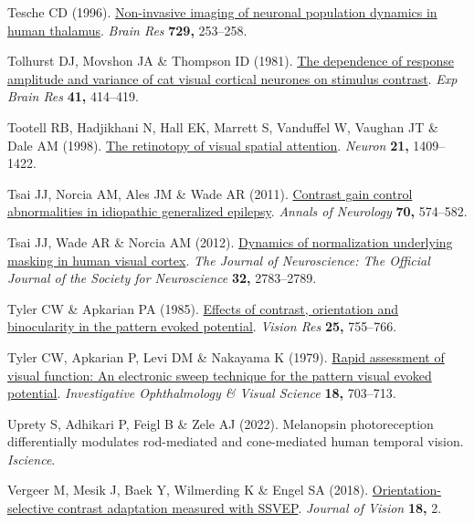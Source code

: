 \documentclass[
  letterpaper,
  DIV=11,
  numbers=noendperiod]{scrartcl}
\newlength{\cslhangindent}
\newenvironment{CSLReferences}[2] %
 {\begin{list}{}{%
  \setlength{\itemindent}{0pt}
  \setlength{\leftmargin}{0pt}
  \setlength{\parsep}{0pt}
  \ifodd #1
   \setlength{\leftmargin}{\cslhangindent}
   \setlength{\itemindent}{-1\cslhangindent}
  \fi
  \setlength{\itemsep}{#2\baselineskip}}}
 {\end{list}}
\begin{document}
\begin{CSLReferences}{1}{1}
Tesche CD (1996).
\href{https://www.ncbi.nlm.nih.gov/pubmed/8876995}{Non-invasive imaging
of neuronal population dynamics in human thalamus}. \emph{Brain Res}
\textbf{729,} 253--258.

Tolhurst DJ, Movshon JA \& Thompson ID (1981).
\href{https://doi.org/10.1007/BF00238900}{The dependence of response
amplitude and variance of cat visual cortical neurones on stimulus
contrast}. \emph{Exp Brain Res} \textbf{41,} 414--419.

Tootell RB, Hadjikhani N, Hall EK, Marrett S, Vanduffel W, Vaughan JT \&
Dale AM (1998). \href{https://doi.org/10.1016/s0896-6273(00)80659-5}{The
retinotopy of visual spatial attention}. \emph{Neuron} \textbf{21,}
1409--1422.

Tsai JJ, Norcia AM, Ales JM \& Wade AR (2011).
\href{https://doi.org/10.1002/ana.22462}{Contrast gain control
abnormalities in idiopathic generalized epilepsy}. \emph{Annals of
Neurology} \textbf{70,} 574--582.

Tsai JJ, Wade AR \& Norcia AM (2012).
\href{https://doi.org/10.1523/JNEUROSCI.4485-11.2012}{Dynamics of
normalization underlying masking in human visual cortex}. \emph{The
Journal of Neuroscience: The Official Journal of the Society for
Neuroscience} \textbf{32,} 2783--2789.

Tyler CW \& Apkarian PA (1985).
\href{https://doi.org/10.1016/0042-6989(85)90183-x}{Effects of contrast,
orientation and binocularity in the pattern evoked potential}.
\emph{Vision Res} \textbf{25,} 755--766.

Tyler CW, Apkarian P, Levi DM \& Nakayama K (1979).
\href{https://www.ncbi.nlm.nih.gov/pubmed/447469}{Rapid assessment of
visual function: An electronic sweep technique for the pattern visual
evoked potential}. \emph{Investigative Ophthalmology \& Visual Science}
\textbf{18,} 703--713.

Uprety S, Adhikari P, Feigl B \& Zele AJ (2022). Melanopsin
photoreception differentially modulates rod-mediated and cone-mediated
human temporal vision. \emph{Iscience}.

Vergeer M, Mesik J, Baek Y, Wilmerding K \& Engel SA (2018).
\href{https://doi.org/10.1167/18.5.2}{Orientation-selective contrast
adaptation measured with {SSVEP}}. \emph{Journal of Vision} \textbf{18,}
2.


\end{CSLReferences}
\end{document}
